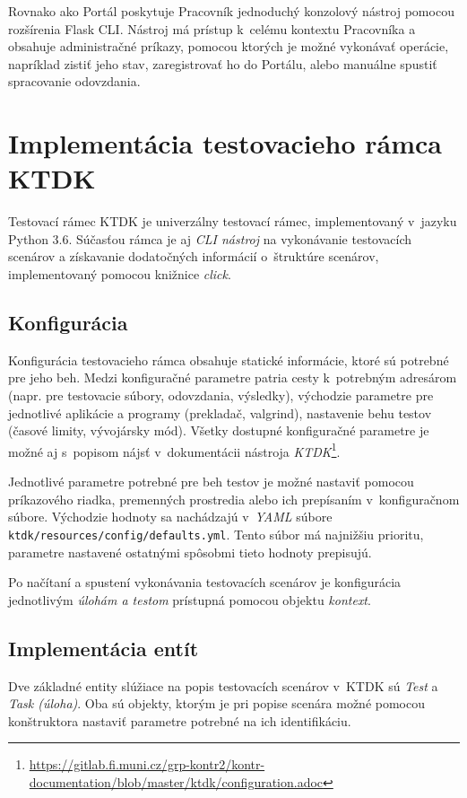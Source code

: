 \documentclass[
  digital, %
  oneside, %
  table,   %
  lof,     %
  lot,   %
]{fithesis3}
\begin{document}
Rovnako ako Portál poskytuje Pracovník jednoduchý konzolový nástroj pomocou rozšírenia Flask CLI. Nástroj má prístup k~celému kontextu Pracovníka a obsahuje administračné príkazy, pomocou ktorých je možné vykonávať operácie, napríklad zistiť jeho stav, zaregistrovať ho do Portálu, alebo manuálne spustiť spracovanie odovzdania.

\section{Implementácia testovacieho rámca KTDK}

Testovací rámec KTDK je univerzálny testovací rámec, implementovaný v~jazyku Python 3.6. Súčasťou rámca je aj \emph{CLI nástroj} na vykonávanie testovacích scenárov a získavanie dodatočných informácií o~štruktúre scenárov, implementovaný pomocou knižnice \emph{click}.

\subsection{Konfigurácia}
Konfigurácia testovacieho rámca obsahuje statické informácie, ktoré sú potrebné pre jeho beh. Medzi konfiguračné parametre patria cesty k~potrebným adresárom (napr. pre testovacie súbory, odovzdania, výsledky), východzie parametre pre jednotlivé aplikácie a programy (prekladač, valgrind), nastavenie behu testov (časové limity, vývojársky mód). Všetky dostupné konfiguračné parametre je možné aj s~popisom nájsť v~dokumentácii nástroja \emph{KTDK}\footnote{\url{https://gitlab.fi.muni.cz/grp-kontr2/kontr-documentation/blob/master/ktdk/configuration.adoc}}.

Jednotlivé parametre potrebné pre beh testov je možné nastaviť pomocou príkazového riadka, premenných prostredia alebo ich prepísaním v~konfiguračnom súbore. Východzie hodnoty sa nachádzajú v~\emph{YAML} súbore \texttt{ktdk/resources/config/defaults.yml}. Tento súbor má najnižšiu prioritu, parametre nastavené ostatnými spôsobmi tieto hodnoty prepisujú.

Po načítaní a spustení vykonávania testovacích scenárov je konfigurácia jednotlivým \emph{úlohám a testom} prístupná pomocou objektu \emph{kontext}.


\subsection{Implementácia entít}

Dve základné entity slúžiace na popis testovacích scenárov v~KTDK sú \emph{Test} a \emph{Task (úloha)}. Oba sú objekty, ktorým je pri popise scenára možné pomocou konštruktora nastaviť parametre potrebné na ich identifikáciu. 
\end{document}
